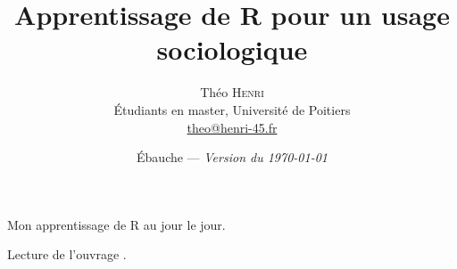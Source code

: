 \documentclass[notitlepage,onecolumn,twoside,11pt,final]{article}
\title{\sffamily Apprentissage de R pour un usage sociologique}
\author{Théo \textsc{Henri}\\{\small Étudiants en master, Université de Poitiers}\\{\small \url{theo@henri-45.fr}}}
\date{Ébauche --- \emph{Version du \today}}
\begin{document}
	\maketitle

	\begin{onecolabstract}
		Mon apprentissage de R au jour le jour.
	\end{onecolabstract}
	\vspace{2em}
	
	\onehalfspacing
	
	Lecture de l'ouvrage \cite{Cor10}.
	
	\pagebreak
	\printglossaries
	\nocite{*}
	\printbibliography

	\pagebreak
	\tableofcontents
\end{document}
